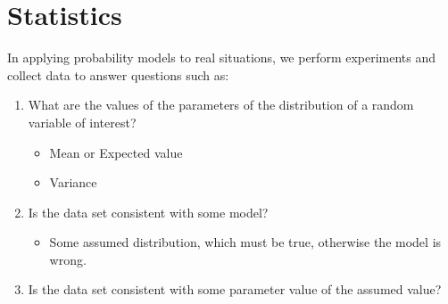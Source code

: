 \section{Statistics} \label{sec:Statistics}
In applying probability models to real situations, we perform experiments and collect data to answer questions such as:
	\begin{enumerate}
		\item What are the values of the parameters of the distribution of a random variable of interest?
			\begin{itemize}[noitemsep, nolistsep]
				\item Mean or Expected value
				\item Variance
			\end{itemize}
		
		\item Is the data set consistent with some model?
			\begin{itemize}[noitemsep, nolistsep]
				\item Some assumed distribution, which must be true, otherwise the model is wrong.
			\end{itemize}
		
		\item Is the data set consistent with some parameter value of the assumed value?
	\end{enumerate}

